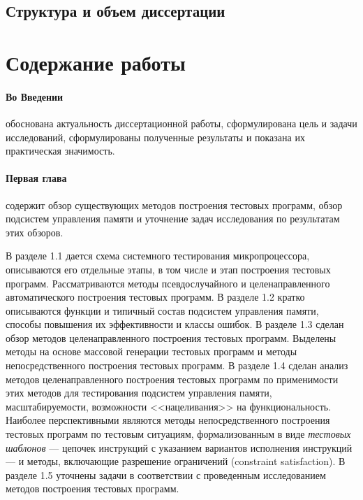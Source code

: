 \documentclass[14pt,autoref,href
,facsimile
]{disser}
\begin{document}

\subsection*{Структура и объем диссертации}
\Structure


%
%


\section*{Содержание работы}

\paragraph{Во Введении} обоснована актуальность диссертационной работы,
сформулирована цель и задачи исследований, сформулированы полученные результаты и показана их
практическая значимость.

%
%


\paragraph{Первая глава} содержит обзор существующих методов построения тестовых программ, обзор подсистем управления памяти и уточнение задач исследования по результатам этих обзоров.

В разделе 1.1 дается схема системного тестирования микропроцессора, описываются его отдельные этапы, в том числе и этап построения тестовых программ. Рассматриваются методы псевдослучайного и целенаправленного автоматического построения тестовых программ. В разделе 1.2 кратко описываются функции и типичный состав подсистем управления памяти, способы повышения их эффективности и классы ошибок. В разделе 1.3 сделан обзор методов целенаправленного построения тестовых программ. Выделены методы на основе массовой генерации тестовых программ и методы непосредственного построения тестовых программ. В разделе 1.4 сделан анализ методов целенаправленного построения тестовых программ по применимости этих методов для тестирования подсистем управления памяти, масштабируемости, возможности <<нацеливания>> на функциональность. Наиболее перспективными являются методы непосредственного построения тестовых программ по тестовым ситуациям, формализованным в виде \emph{тестовых шаблонов} --- цепочек инструкций с указанием вариантов исполнения инструкций --- и методы, включающие разрешение ограничений (constraint satisfaction). В разделе 1.5 уточнены задачи в соответствии с проведенным исследованием методов построения тестовых программ.
\end{document}
